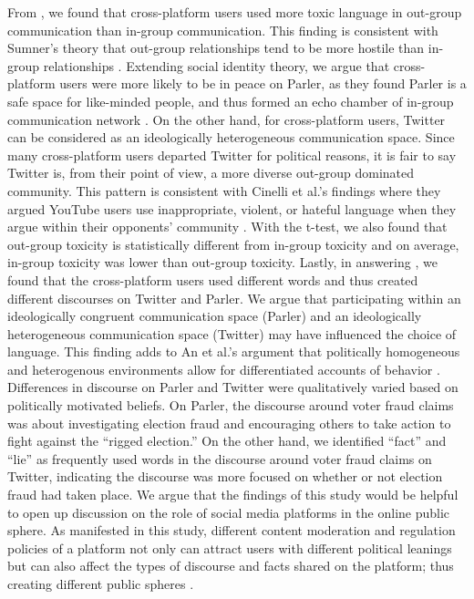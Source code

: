 \documentclass[Crown,sagev,times]{sagej}
\begin{document}
From , we found that cross-platform users used more toxic language in out-group communication than in-group
communication. This finding is consistent with Sumner's theory that out-group relationships tend to be more hostile than 
in-group relationships \cite{sumner1906folkways}. 
Extending social identity theory, we argue that cross-platform users were more likely to be in peace on Parler, 
as they found Parler is a safe space for like-minded people, and thus formed an echo chamber of in-group communication network
\cite{zannettou2018gab}. On the other hand, for cross-platform users, Twitter can be considered as an ideologically 
heterogeneous communication space. Since many cross-platform users departed Twitter for political reasons, 
it is fair to say Twitter is, from their point of view, a more diverse out-group dominated community. 
This pattern is consistent with Cinelli et al.'s findings where they argued 
YouTube users use inappropriate, violent, or hateful language when they argue within their opponents' community \cite{cinelli2021dynamics}.
With the t-test, we also found that out-group toxicity is statistically different from in-group toxicity and on average, 
in-group toxicity was lower than out-group toxicity. 
Lastly, in answering , we found that the cross-platform users used different words and 
thus created different discourses on Twitter and Parler. We argue that participating within an ideologically 
congruent communication space (Parler) and an ideologically heterogeneous communication space (Twitter) 
may have influenced the choice of language. This finding adds to An et al.'s argument 
that politically homogeneous and heterogenous environments allow for differentiated accounts of behavior \cite{an2019political}. 
Differences in discourse on Parler and Twitter were qualitatively varied based on politically motivated beliefs. 
On Parler, the discourse around voter fraud claims was about investigating election fraud and encouraging others 
to take action to fight against the ``rigged election.'' On the other hand, we identified ``fact'' and ``lie'' 
as frequently used words in the discourse around voter fraud claims on Twitter, indicating the discourse was more 
focused on whether or not election fraud had taken place. We argue that the findings of this study would be helpful 
to open up discussion on the role of social media platforms in the online public sphere. 
As manifested in this study, different content moderation and regulation policies of a platform not only can attract 
users with different political leanings but can also affect the types of discourse and facts shared on the platform; 
thus creating different public spheres \cite{habermas1991structural}. 
\end{document}
